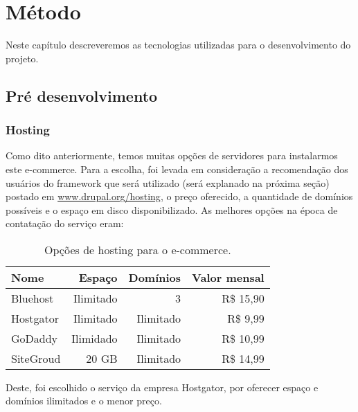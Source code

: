 \chapter{Método}

\graphicspath{ {/var/www/html/meninadasbalas/project/monografia/latex/images/} }

Neste capítulo descreveremos as tecnologias utilizadas para o desenvolvimento do projeto.

\section{Pré desenvolvimento}

\subsection{Hosting}
Como dito anteriormente, temos muitas opções de servidores para instalarmos este e-commerce. Para a escolha, foi levada em consideração a recomendação dos usuários do framework que será utilizado (será explanado na próxima seção) postado em \url{www.drupal.org/hosting}, o preço oferecido, a quantidade de domínios possíveis e o espaço em disco disponibilizado. As melhores opções na época de contatação do serviço eram:

\begin{table}[h]
  \begin{center}
    \begin{tabular}{ | l | r | r | r |}
      \hline
      Nome & Espaço & Domínios & Valor mensal\\ \hline
      Bluehost & Ilimitado & 3 & R\$ 15,90 \\ \hline
      Hostgator & Ilimitado & Ilimitado & R\$ 9,99 \\ \hline
      GoDaddy & Ilimidado & Ilimitado & R\$ 10,99 \\ \hline
      SiteGroud & 20 GB & Ilimitado & R\$ 14,99 \\ \hline
    \end{tabular}
    \caption{Opções de hosting para o e-commerce.}
    \label{hosting}
  \end{center}
\end{table}

Deste, foi escolhido o serviço da empresa Hostgator, por oferecer espaço e domínios ilimitados e o menor preço.

